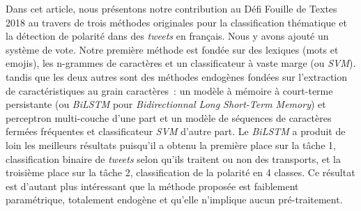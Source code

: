 
 Dans cet article, nous présentons notre contribution au Défi Fouille de Textes 2018 au travers de trois méthodes originales pour la classification thématique et la détection de polarité dans des \textit{tweets} en français. Nous y avons ajouté un système de vote.
 Notre première méthode est fondée sur des lexiques (mots et emojis),
 les n-grammes de caractères et un classificateur à vaste marge (ou \textit{SVM}).
 tandis que les deux autres sont des méthodes endogènes fondées sur l'extraction de caractéristiques au grain caractères~: un modèle à mémoire à court-terme persistante (ou \textit{BiLSTM} pour \textit{Bidirectionnal Long Short-Term Memory}) et perceptron multi-couche d'une part et un modèle de séquences de caractères fermées fréquentes et classificateur \textit{SVM} d'autre part.
 Le \textit{BiLSTM} a produit de loin les meilleurs résultats puisqu'il a obtenu la première place sur la tâche 1, classification binaire de \textit{tweets} selon qu'ils traitent ou non des transports, et la troisième place sur la tâche 2, classification de la polarité en 4 classes.
 Ce résultat est d'autant plus intéressant que la méthode proposée est faiblement paramétrique, totalement endogène et qu'elle n'implique aucun pré-traitement.

